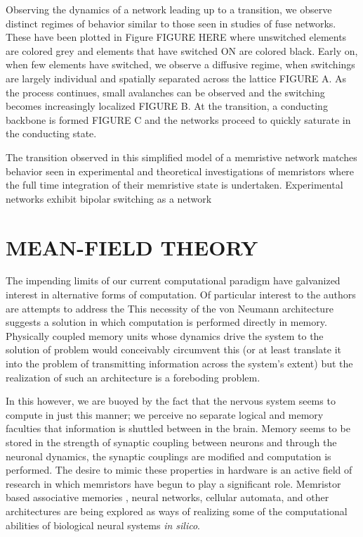 \documentclass[aps,prl,preprint,groupedaddress]{revtex4-1}
\begin{document}
Observing the dynamics of a network leading up to a transition, we observe
distinct regimes of behavior similar to those seen in studies of fuse
networks. These have been plotted in Figure FIGURE HERE
where unswitched elements are colored grey and elements that have switched
ON are colored black. Early on, when few elements have switched,
we observe a diffusive regime, when switchings are largely individual and
spatially separated across the lattice FIGURE A.  As the process continues,
small avalanches can be observed and the switching becomes increasingly
localized FIGURE B.  At the transition, a conducting backbone is formed
FIGURE C and the networks proceed to quickly saturate in the conducting state.

The transition observed in this simplified model of a memristive network
matches behavior seen in experimental and theoretical investigations of
memristors where the full time integration of their memristive state is
undertaken.  Experimental networks exhibit bipolar switching as a network



\section{MEAN-FIELD THEORY}


The impending limits of our current computational paradigm have galvanized
interest in alternative forms of computation. Of particular interest to the
authors are attempts to address the 
This necessity of the von Neumann architecture suggests a solution in which
computation is performed directly in memory.  Physically coupled memory units
whose dynamics drive the system to the solution of problem
would conceivably circumvent this (or at least translate it into the
problem of transmitting information across the system's extent) but the
realization of such an architecture is a foreboding problem.

In this however, we are buoyed by the fact that the nervous system seems to
compute in just this manner; we perceive no separate logical and memory
faculties that information is shuttled between in the brain.  Memory seems
to be stored
in the strength of synaptic coupling between neurons and through the neuronal
dynamics, the synaptic couplings are modified and computation is performed.
The desire to mimic these properties in hardware is an active field of
research in which memristors have begun to play a significant role.  
Memristor based associative memories \cite{Pershin2010, Eryilmaz2014},
 neural networks, cellular automata,
and other architectures are being explored as ways of realizing some
of the computational abilities of biological neural systems
\textit{in silico}.
\end{document}
